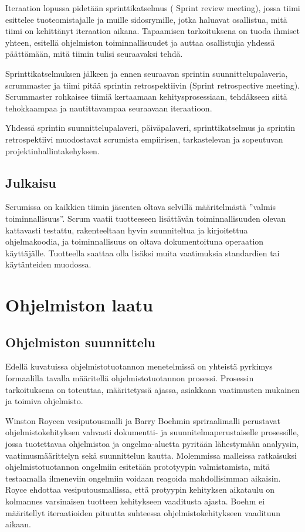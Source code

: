\documentclass[finnish]{tktltiki2}
\theoremstyle{definition}
\theoremstyle{remark}
\begin{document}
Iteraation lopussa pidetään sprinttikatselmus ( Sprint review meeting), jossa tiimi esittelee tuoteomistajalle ja muille sidosrymille, jotka haluavat osallistua, mitä tiimi on kehittänyt iteraation aikana. Tapaamisen tarkoituksena on tuoda ihmiset yhteen, esitellä ohjelmiston toiminnallisuudet ja auttaa osallistujia yhdessä päättämään, mitä tiimin tulisi seuraavaksi tehdä\cite{SCH09}. 

Sprinttikatselmuksen jälkeen ja ennen seuraavan sprintin suunnittelupalaveria, scrummaster ja tiimi pitää sprintin retrospektiivin (Sprint retrospective meeting). Scrummaster rohkaisee tiimiä kertaamaan kehitysprosessiaan, tehdäkseen siitä tehokkaampaa ja nautittavampaa seuraavaan iteraatioon\cite{SCH09}.

Yhdessä sprintin suunnittelupalaveri, päiväpalaveri, sprinttikatselmus ja sprintin retrospektiivi muodostavat scrumista empiirisen, tarkastelevan ja sopeutuvan projektinhallintakehyksen\cite{SCH09}.

\subsection*{Julkaisu}
Scrumissa on kaikkien tiimin jäsenten oltava selvillä määritelmästä ''valmis toiminnallisuus''. Scrum vaatii tuotteeseen lisättävän toiminnallisuuden olevan kattavasti testattu, rakenteeltaan hyvin suunniteltua ja kirjoitettua ohjelmakoodia, ja toiminnallisuus on oltava dokumentoituna operaation käyttäjälle. Tuotteella saattaa olla lisäksi muita vaatimuksia standardien tai käytänteiden muodossa\cite{SCH09}.

\section{Ohjelmiston laatu}

\subsection{Ohjelmiston suunnittelu}
Edellä kuvatuissa ohjelmistotuotannon menetelmissä on yhteistä pyrkimys formaalilla tavalla määritellä ohjelmistotuotannon prosessi. Prosessin tarkoituksena on toteuttaa, määritetyssä ajassa,  asiakkaan vaatimusten mukainen ja toimiva ohjelmisto. 

Winston Roycen vesiputousmalli ja Barry Boehmin spriraalimalli perustavat ohjelmistokehityksen vahvasti dokumentti- ja suunnitelmaperustaiselle prosessille, jossa tuotettavaa ohjelmistoa ja ongelma-aluetta pyritään lähestymään analyysin, vaatimusmäärittelyn sekä suunnittelun kautta. Molemmissa malleissa ratkaisuksi ohjelmistotuotannon ongelmiin esitetään prototyypin valmistamista, mitä testaamalla ilmeneviin ongelmiin voidaan reagoida mahdollisimman aikaisin. Royce ehdottaa vesiputousmallissa, että protyypin kehityksen aikataulu on kolmannes varsinaisen tuotteen kehitykseen vaaditusta ajasta\cite{ROY70}. Boehm ei määritellyt iteraatioiden pituutta suhteessa ohjelmistokehitykseen vaadituun aikaan.
\end{document}
